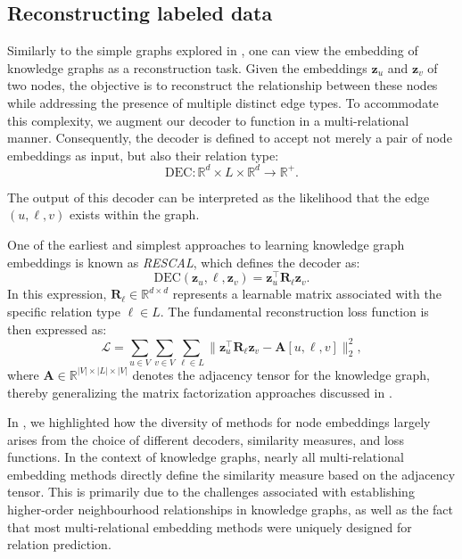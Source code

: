 \subsection{Reconstructing labeled data}
Similarly to the simple graphs explored in , one can view the embedding of knowledge graphs as a reconstruction task. Given the embeddings $ \mathbf{z}_u $ and $ \mathbf{z}_v $ of two nodes, the objective is to reconstruct the relationship between these nodes while addressing the presence of multiple distinct edge types. To accommodate this complexity, we augment our decoder to function in a multi-relational manner. Consequently, the decoder is defined to accept not merely a pair of node embeddings as input, but also their relation type:
\begin{equation*}
    \text{DEC}: \mathbb{R}^d \times L \times \mathbb{R}^d \to \mathbb{R}^+.
\end{equation*}

The output of this decoder can be interpreted as the likelihood that the edge $ (u,\ell,v) $ exists within the graph.

One of the earliest and simplest approaches to learning knowledge graph embeddings is known as \textit{RESCAL}, which defines the decoder as:
\begin{equation}\label{eq:RESCAL}
    \text{DEC}(\mathbf{z}_u, \ell, \mathbf{z}_v) = \mathbf{z}_u^\top \mathbf{R}_\ell \mathbf{z}_v.
\end{equation}
In this expression, $ \mathbf{R}_\ell\in \mathbb{R}^{d\times d} $ represents a learnable matrix associated with the specific relation type $ \ell\in L $. The fundamental reconstruction loss function is then expressed as:
\begin{equation}\label{eq:reconstructionLossMulti}
    \mathcal{L} = \sum_{u\in V}\sum_{v\in V}\sum_{\ell\in L} \|\mathbf{z}_u^\top \mathbf{R}_\ell \mathbf{z}_v - \mathbf{A}[u,\ell,v]\|_2^2,
\end{equation}
where $ \mathbf{A}\in\mathbb{R}^{|V|\times|L|\times|V|} $ denotes the adjacency tensor for the knowledge graph, thereby generalizing the matrix factorization approaches discussed in .

\medskip
In , we highlighted how the diversity of methods for node embeddings largely arises from the choice of different decoders, similarity measures, and loss functions. In the context of knowledge graphs, nearly all multi-relational embedding methods directly define the similarity measure based on the adjacency tensor. This is primarily due to the challenges associated with establishing higher-order neighbourhood relationships in knowledge graphs, as well as the fact that most multi-relational embedding methods were uniquely designed for relation prediction.

